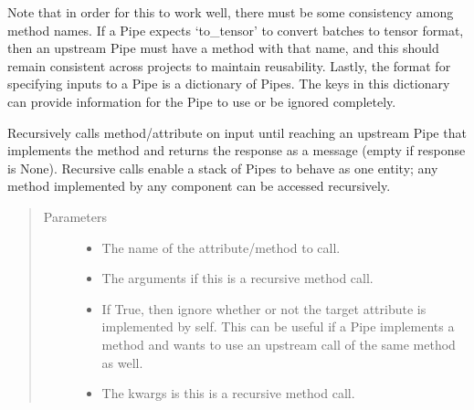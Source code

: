 \documentclass[letterpaper,10pt,english]{sphinxmanual}
\begin{document}
\begin{fulllineitems}
Note that in order for this to work well, there must be some consistency among method names. If a Pipe expects ‘to\_tensor’ to convert batches to tensor format, then an upstream Pipe must have a method with that name, and this should remain consistent across projects to maintain reusability. Lastly, the format for specifying inputs to a Pipe is a dictionary of Pipes. The keys in this dictionary can provide information for the Pipe to use or be ignored completely.

\begin{fulllineitems}
\label{\detokenize{Fireworks:Fireworks.core.pipe.Pipe.name}}
\end{fulllineitems}


\begin{fulllineitems}
\label{\detokenize{Fireworks:Fireworks.core.pipe.Pipe.recursive_call}}
Recursively calls method/attribute on input until reaching an upstream Pipe that implements the method and
returns the response as a message (empty if response is None).
Recursive calls enable a stack of Pipes to behave as one entity; any method implemented by any component can be accessed
recursively.
\begin{quote}\begin{description}
\item[{Parameters}] \leavevmode\begin{itemize}
\item {} 
 \textendash{} The name of the attribute/method to call.

\item {} 
 \textendash{} The arguments if this is a recursive method call.

\item {} 
 \textendash{} If True, then ignore whether or not the target attribute is implemented by self. This can be useful if a Pipe
implements a method and wants to use an upstream call of the same method as well.

\item {} 
 \textendash{} The kwargs is this is a recursive method call.


\end{itemize}
\end{description}
\end{quote}
\end{fulllineitems}
\end{fulllineitems}
\end{document}
